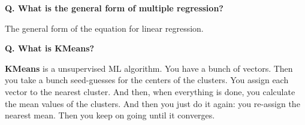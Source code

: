 \begin{frame}[fragile]{\textbf{Q. What is the general form of multiple regression?}}
  \begin{wideitemize}
    \item The general form of the equation for linear regression.
  \end{wideitemize}
\end{frame}


\begin{frame}[fragile]{\textbf{Q. What is KMeans?}}
  \begin{wideitemize}
  \item \textbf{KMeans} is a unsupervised ML algorithm. You have a bunch of
  vectors. Then you take a bunch seed-guesses for the centers of the clusters.
  You assign each vector to the nearest cluster. And then, when everything is
  done, you calculate the mean values of the clusters. And then you just do it
  again: you re-assign the nearest mean. Then you keep on going until it converges.
  \end{wideitemize}
\end{frame}



